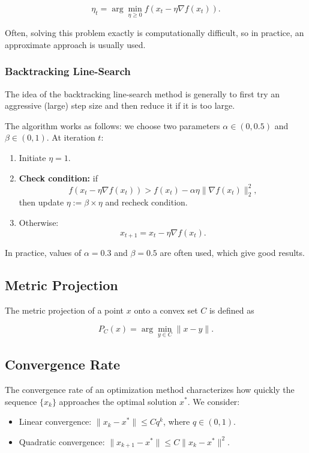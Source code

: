 \documentclass[a4paper,12pt]{article}
\begin{document}
\[
\eta_t = \arg\min_{\eta \geq 0} f(x_t - \eta \nabla f(x_t)).
\]

Often, solving this problem exactly is computationally difficult, so in practice, an approximate approach is usually used.


\subsubsection{Backtracking Line-Search}

The idea of the backtracking line-search method is generally to first try an aggressive (large) step size and then reduce it if it is too large.

The algorithm works as follows: we choose two parameters $\alpha \in (0, 0.5)$ and $\beta \in (0, 1)$. At iteration $t$:

\begin{enumerate}
    \item Initiate $\eta = 1$.
    \item \textbf{Check condition:} if 
    \[
    f(x_t - \eta \nabla f(x_t)) > f(x_t) - \alpha \eta \|\nabla f(x_t)\|_2^2,
    \]
    then update $\eta := \beta \times \eta$ and recheck condition.
    \item Otherwise:
    \[
    x_{t+1} = x_t - \eta \nabla f(x_t).
    \]
\end{enumerate}

In practice, values of $\alpha = 0.3$ and $\beta = 0.5$ are often used, which give good results.

\subsection{Metric Projection}
The metric projection of a point $x$ onto a convex set $C$ is defined as

\begin{equation}
    P_C(x) = \arg\min_{y \in C} \|x - y\|.
\end{equation}

\subsection{Convergence Rate}
The convergence rate of an optimization method characterizes how quickly the sequence $\{x_k\}$ approaches the optimal solution $x^*$. We consider:

\begin{itemize}
    \item Linear convergence: $\|x_k - x^*\| \leq C q^k$, where $q \in (0,1)$.
    \item Quadratic convergence: $\|x_{k+1} - x^*\| \leq C \|x_k - x^*\|^2$.
\end{itemize}
\end{document}
